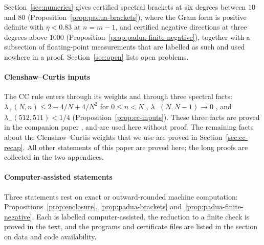 \documentclass[preprint,12pt,a4paper]{elsarticle}
\theoremstyle{remark}
\begin{document}
Section~\ref{sec:numerics} gives certified spectral brackets at six degrees
between $10$ and $80$ (Proposition~\ref{prop:padua-brackets}), where the Gram form is positive
definite with $\eta<0.83$ at $n=m-1$, and certified negative directions at three degrees
above $1000$ (Proposition~\ref{prop:padua-finite-negative}), together with a
subsection of floating-point measurements that are labelled as such and used
nowhere in a proof. Section~\ref{sec:open} lists open problems.

\paragraph{Clenshaw--Curtis inputs}
The CC rule enters through its weights and through three spectral
facts: $\lambda_+(N,n)\le2-4/N+4/N^2$ for $0\le n<N$ \citep[Cor.~3.2]{MZ-CC},
$\lambda_-(N,N-1)\to0$ \citep[Thm~4.3]{MZ-CC}, and
$\lambda_-(512,511)<1/4$ \citep[Prop.~8.1]{MZ-CC}
(Proposition~\ref{prop:cc-inputs}). These three facts are
proved in the companion paper \citep{MZ-CC}, and are used here without proof.
The remaining facts about the Clenshaw--Curtis weights that we use are proved in
Section~\ref{sec:cc-recap}. All other statements of this paper are proved here; the
long proofs are collected in the two appendices.

\paragraph{Computer-assisted statements}
Three statements rest on exact or outward-rounded machine computation:
Propositions~\ref{prop:enclosure}, \ref{prop:padua-brackets}
and~\ref{prop:padua-finite-negative}. Each is labelled computer-assisted, the reduction to a finite check is
proved in the text, and the programs and certificate files are listed in the section on data
and code availability.
\end{document}
